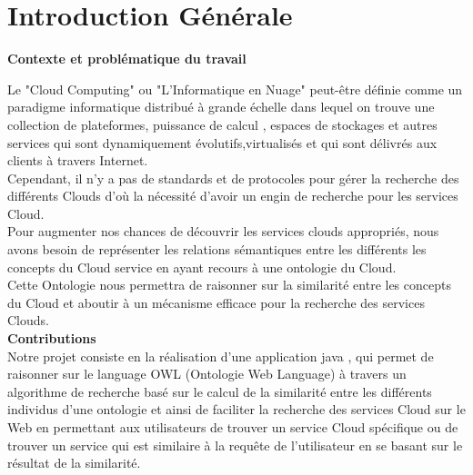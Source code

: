 \chapter*{Introduction Générale}

    \hspace{1.5cm} \textbf{ Contexte et problématique du travail}

        Le "Cloud Computing" ou "L'Informatique en Nuage" peut-être définie comme un paradigme informatique distribué à grande échelle dans lequel on trouve une collection de plateformes, puissance de calcul , espaces de stockages et autres services qui sont dynamiquement évolutifs,virtualisés et qui sont délivrés aux clients à travers Internet.\\
        Cependant, il n'y a pas de standards et de protocoles pour gérer la recherche des différents Clouds d'où la nécessité d'avoir un engin de recherche pour les services Cloud.\\
        Pour augmenter nos chances de découvrir les services clouds appropriés, nous avons besoin de représenter les relations sémantiques entre les différents les concepts du Cloud service en ayant recours à une ontologie du Cloud.\\
        Cette Ontologie nous permettra de  raisonner sur la similarité entre les concepts du Cloud et aboutir à un mécanisme efficace pour la recherche des services Clouds.\\

    \hspace{1.5cm} \textbf{ Contributions  }\\
        Notre projet consiste en la réalisation d'une application java , qui permet de raisonner sur le language OWL (Ontologie Web Language) à travers un algorithme de recherche basé sur le calcul de la similarité entre les différents individus d'une ontologie et ainsi de faciliter la recherche des services Cloud sur le Web en permettant aux utilisateurs de trouver un service Cloud spécifique ou de trouver un service qui est similaire à la requête de l'utilisateur en se basant sur le résultat de la similarité.\\




